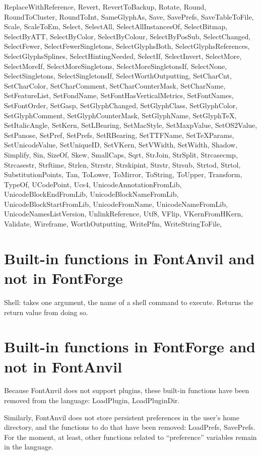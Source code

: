\documentclass[11pt]{report}
\begin{document}
ReplaceWithReference,
Revert,
RevertToBackup,
Rotate,
Round,
RoundToCluster,
RoundToInt,
SameGlyphAs,
Save,
SavePrefs,
SaveTableToFile,
Scale,
ScaleToEm,
Select,
SelectAll,
SelectAllInstancesOf,
SelectBitmap,
SelectByATT,
SelectByColor,
SelectByColour,
SelectByPosSub,
SelectChanged,
SelectFewer,
SelectFewerSingletons,
SelectGlyphsBoth,
SelectGlyphsReferences,
SelectGlyphsSplines,
SelectHintingNeeded,
SelectIf,
SelectInvert,
SelectMore,
SelectMoreIf,
SelectMoreSingletons,
SelectMoreSingletonsIf,
SelectNone,
SelectSingletons,
SelectSingletonsIf,
SelectWorthOutputting,
SetCharCnt,
SetCharColor,
SetCharComment,
SetCharCounterMask,
SetCharName,
SetFeatureList,
SetFondName,
SetFontHasVerticalMetrics,
SetFontNames,
SetFontOrder,
SetGasp,
SetGlyphChanged,
SetGlyphClass,
SetGlyphColor,
SetGlyphComment,
SetGlyphCounterMask,
SetGlyphName,
SetGlyphTeX,
SetItalicAngle,
SetKern,
SetLBearing,
SetMacStyle,
SetMaxpValue,
SetOS2Value,
SetPanose,
SetPref,
SetPrefs,
SetRBearing,
SetTTFName,
SetTeXParams,
SetUnicodeValue,
SetUniqueID,
SetVKern,
SetVWidth,
SetWidth,
Shadow,
Simplify,
Sin,
SizeOf,
Skew,
SmallCaps,
Sqrt,
StrJoin,
StrSplit,
Strcasecmp,
Strcasestr,
Strftime,
Strlen,
Strrstr,
Strskipint,
Strstr,
Strsub,
Strtod,
Strtol,
SubstitutionPoints,
Tan,
ToLower,
ToMirror,
ToString,
ToUpper,
Transform,
TypeOf,
UCodePoint,
Ucs4,
UnicodeAnnotationFromLib,
UnicodeBlockEndFromLib,
UnicodeBlockNameFromLib,
UnicodeBlockStartFromLib,
UnicodeFromName,
UnicodeNameFromLib,
UnicodeNamesListVersion,
UnlinkReference,
Utf8,
VFlip,
VKernFromHKern,
Validate,
Wireframe,
WorthOutputting,
WritePfm,
WriteStringToFile,

\section{Built-in functions in FontAnvil and not in FontForge}

Shell:  takes one argument, the name of a shell command to execute.  Returns
the return value from doing so.

\section{Built-in functions in FontForge and not in FontAnvil}

Because FontAnvil does not support plugins, these built-in functions have
been removed from the language:  LoadPlugin, LoadPluginDir.

Similarly, FontAnvil does not store persistent preferences in the user's
home directory, and the functions to do that have been removed: LoadPrefs,
SavePrefs.  For the moment, at least, other functions related to
``preference'' variables remain in the language.
\end{document}
